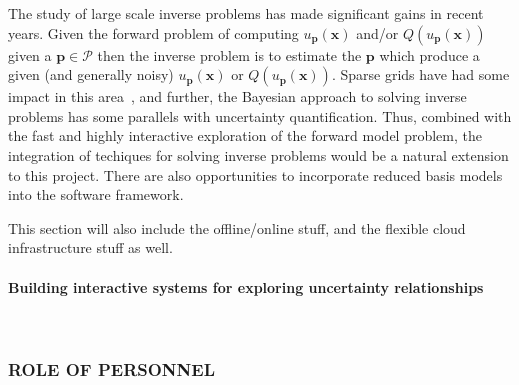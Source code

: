 \documentclass[a4paper,fontsize=12pt]{scrartcl}
\begin{document}
The study of large scale inverse problems has made significant gains in recent years. Given the forward problem of computing $u_{\mathbf{p}}(\mathbf{x})$ and/or $Q(u_{\mathbf{p}}(\mathbf{x}))$ given a $\mathbf{p}\in\mathcal{P}$ then the inverse problem is to estimate the $\mathbf{p}$ which produce a given (and generally noisy) $u_{\mathbf{p}}(\mathbf{x})$ or $Q(u_{\mathbf{p}}(\mathbf{x}))$.
Sparse grids have had some impact in this area~\cite{Zabaras2010}, and further, the Bayesian approach to solving inverse problems has some parallels with uncertainty quantification.
Thus, combined with the fast and highly interactive exploration of the forward model problem, the integration of techiques for solving inverse problems would be a natural extension to this project.
There are also opportunities to incorporate reduced basis models~\cite{LiebermanEtal2010,Peherstorfer2013,ChenSchwab2015} into the software framework.















This section will also include the offline/online stuff, and the
flexible cloud infrastructure stuff as well.

\paragraph*{Building interactive systems for exploring uncertainty relationships}\mbox{}\\



\subsubsection*{ROLE OF PERSONNEL}
\end{document}
